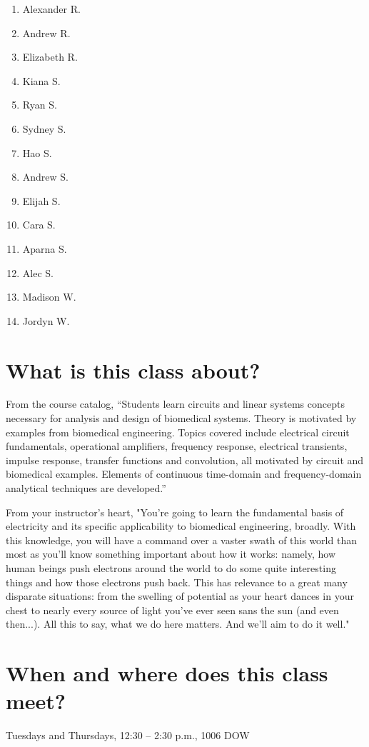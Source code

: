 \documentclass[11pt]{book}
\begin{document}
\begin{enumerate}
	\item Alexander R.
	\item Andrew R.
	\item Elizabeth R.
	\item Kiana S.
	\item Ryan S.
	\item Sydney S.
	\item Hao S.
	\item Andrew S.
	\item Elijah S.
	\item Cara S.
	\item Aparna S.
	\item Alec S.
	\item Madison W.
	\item Jordyn W.
\end{enumerate}


\section{What is this class about?}
From the course catalog, ``Students learn circuits and linear systems concepts necessary for analysis and design of biomedical systems. Theory is motivated by examples from biomedical engineering. Topics covered include electrical circuit fundamentals, operational amplifiers, frequency response, electrical transients, impulse response, transfer functions and convolution, all motivated by circuit and biomedical examples. Elements of continuous time-domain and frequency-domain analytical techniques are developed.''

From your instructor's heart, "You’re going to learn the fundamental basis of electricity and its specific applicability to biomedical engineering, broadly. With this knowledge, you will have a command over a vaster swath of this world than most as you’ll know something important about how it works: namely, how human beings push electrons around the world to do some quite interesting things and how those electrons push back. This has relevance to a great many disparate situations: from the swelling of potential as your heart dances in your chest to nearly every source of light you’ve ever seen sans the sun (and even then...). All this to say, what we do here matters. And we’ll aim to do it well."

\section{When and where does this class meet?}
Tuesdays and Thursdays, 12:30 -- 2:30 p.m., 1006 DOW
\end{document}
